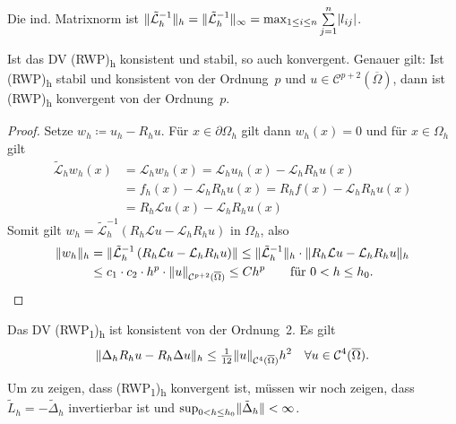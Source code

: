 \documentclass{cheat-sheet}
\newcommand{\Cont}{\mathcal{C}} %
\newcommand{\clos}[1]{\overline{#1}} %
\newcommand{\cOmega}{\clos{\Omega}} %
\newcommand{\bOmega}{\partial \Omega} %
\newcommand{\LL}{\mathcal{L}} %
\newcommand{\Laplace}{\Delta}
\newcommand{\tss}[1]{\textsubscript{#1}} %
\begin{document}
\begin{bem}
  Die ind. Matrixnorm ist $\norm{\tilde{\LL}_h^{-1}}_h = \norm{\tilde{\LL}_h^{-1}}_\infty = \max_{1 \leq i \leq n} \sum_{j=1}^n \abs{l_{ij}}$.
\end{bem}


\begin{satz}
  Ist das DV (RWP)\tss{h} konsistent und stabil, so auch konvergent.
  Genauer gilt: Ist (RWP)\tss{h} stabil und konsistent von der Ordnung~$p$ und $u \in \Cont^{p+2}(\cOmega)$, dann ist (RWP)\tss{h} konvergent von der Ordnung~$p$.
\end{satz}


\begin{proof}
  Setze $w_h \coloneqq u_h - R_h u$.
  Für $x \in \bOmega_h$ gilt dann $w_h(x) = 0$ und für $x \in \Omega_h$ gilt
  \begin{align*}
    \tilde{\LL}_h w_h(x) &= \LL_h w_h(x) = \LL_h u_h(x) - \LL_h R_h u(x) \\
    &= f_h(x) - \LL_h R_h u(x) = R_h f(x) - \LL_h R_h u(x) \\
    &= R_h \LL u(x) - \LL_h R_h u(x)
  \end{align*}
  Somit gilt $w_h = \tilde{\LL}_h^{-1} \left( R_h \LL u - \LL_h R_h u \right)$ in $\Omega_h$, also
  \begin{align*}
    \norm{w_h}_h &= \norm{\tilde{\LL}_h^{-1} \left( R_h \LL u - \LL_h R_h u \right)}
    \leq \norm{\tilde{\LL}_h^{-1}}_h \cdot \norm{R_h \LL u - \LL_h R_h u}_h \\
    & \leq c_1 \cdot c_2 \cdot h^p \cdot \norm{u}_{\Cont^{p+2}(\cOmega)}
    \leq C h^p \qquad
    \text{für $0 < h \leq h_0$.} \qedhere
  \end{align*}
\end{proof}

\begin{lem}
  Das DV (RWP\tss{1})\tss{h} ist konsistent von der Ordnung~2.
  Es gilt
  \[
    \norm{\Laplace_h R_h u - R_h \Laplace u}_h \leq \tfrac{1}{12} \norm{u}_{\Cont^4(\cOmega)} h^2 \quad
    \forall u \in \Cont^4(\cOmega).
  \]
\end{lem}


\begin{bem}
  Um zu zeigen, dass (RWP\tss{1})\tss{h} konvergent ist, müssen wir noch zeigen, dass $\tilde{L}_h = - \tilde{\Laplace}_h$ invertierbar ist und $\sup_{0 < h \leq h_0} \norm{\tilde{\Laplace}_h} < \infty$.
\end{bem}
\end{document}
